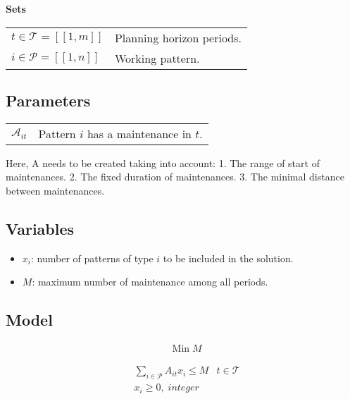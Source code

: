 \documentclass[a4paper,11pt]{article}
\begin{document}
    \textbf{Sets}

    \begin{tabular}{ll}
    $t\in \mathcal{T} = [\![1, m]\!]$ & Planning horizon periods. \\
    $i \in \mathcal{P} = [\![1, n]\!]$ & Working pattern.\\
    \end{tabular}

    \vskip 0.3cm

    \subsection{Parameters}

    \begin{tabular}{ll}
        $\mathcal{A}_{it}$ & Pattern $i$ has a maintenance in $t$.\\
    \end{tabular}

    \vskip 0.3cm

    Here, A needs to be created taking into account:
    1. The range of start of maintenances.
    2. The fixed duration of maintenances.
    3. The minimal distance between maintenances.

    \subsection{Variables}

    \begin{itemize}
     \item $x_i$: number of patterns of type $i$ to be included in the solution.
     \item $M$: maximum number of maintenance among all periods.
    \end{itemize}

    \subsection{Model}

    \begin{align}
        & \text{Min}\; M
    \end{align}

    \begin{align}
        & \sum_{i \in \mathcal{P}} A_{it}x_{i} \leq M & t \in \mathcal{T} \\
        & x_{i} \geq 0,\; integer \\
    \end{align}
\end{document}

